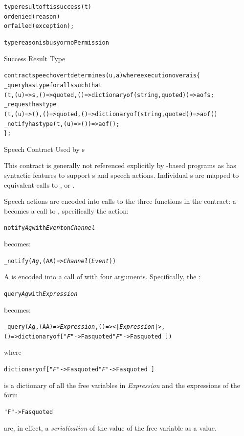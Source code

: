 \begin{program}
\begin{alltt}
type result of t is success(t)
  or denied(reason)
  or failed(exception);

type reason is busy or noPermission
\end{alltt}
\caption{Success Result Type}
\label{successTypeProg}
\end{program}


\begin{program}
\begin{alltt}
contract speech over t determines (u,a) where execution over a is \{
  _query has type for all s such that 
      (t,(u)=>s,()=>quoted,()=>dictionary of (string,quoted))=> a of s;
  _request has type
      (t,(u)=>(),()=>quoted,()=>dictionary of (string,quoted)) => a of ()
  _notify has type (t,(u)=>()) => a of ();
\};
\end{alltt}
\caption{Speech Contract Used by s}
\label{speechContractProg}
\end{program}

This contract is generally not referenced explicitly by -based programs as \Sr has syntactic features to support s and speech actions. Individual s are mapped to equivalent calls to ,  or .

Speech actions are encoded into calls to the three functions in the  contract: a  becomes a call to , specifically the  action:

\begin{alltt}
notify \emph{Ag} with \emph{Event} on \emph{Channel}
\end{alltt}
becomes:
\begin{alltt}
_notify(\emph{Ag}, (AA)=>\emph{Channel}(\emph{Event}))
\end{alltt}

A  is encoded into a call of  with four arguments. Specifically, the :
\begin{alltt}
query \emph{Ag} with \emph{Expression}
\end{alltt}
becomes:
\begin{alltt}
\_query(\emph{Ag}, (AA)=>\emph{Expression}, ()=><|\emph{Expression}|>,
      ()=> dictionary of ["\emph{F}"->F as quoted\sequence{,}"\emph{F\subn}"->F\subn as quoted\,])
\end{alltt}
where
\begin{alltt}
dictionary of ["\emph{F}"->F as quoted\sequence{,}"\emph{F\subn}"->F\subn as quoted\,]
\end{alltt}
is a dictionary of all the free variables in \emph{Expression} and the expressions of the form
\begin{alltt}
"F\subi"->F\subi as quoted
\end{alltt}
are, in effect, a \emph{serialization} of the value of the free variable as a  value.

